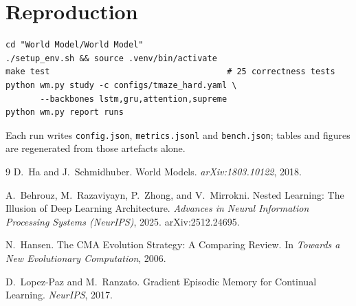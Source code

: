 \documentclass[11pt,a4paper]{article}
\newcommand{\code}[1]{\texttt{\small #1}}
\begin{document}
\section{Reproduction}

\begin{lstlisting}
cd "World Model/World Model"
./setup_env.sh && source .venv/bin/activate
make test                                    # 25 correctness tests
python wm.py study -c configs/tmaze_hard.yaml \
       --backbones lstm,gru,attention,supreme
python wm.py report runs
\end{lstlisting}

Each run writes \code{config.json}, \code{metrics.jsonl} and \code{bench.json};
tables and figures are regenerated from those artefacts alone.

\begin{thebibliography}{9}
D.~Ha and J.~Schmidhuber.
\newblock World Models.
\newblock \emph{arXiv:1803.10122}, 2018.

A.~Behrouz, M.~Razaviyayn, P.~Zhong, and V.~Mirrokni.
\newblock Nested Learning: The Illusion of Deep Learning Architecture.
\newblock \emph{Advances in Neural Information Processing Systems (NeurIPS)},
2025. arXiv:2512.24695.

N.~Hansen.
\newblock The CMA Evolution Strategy: A Comparing Review.
\newblock In \emph{Towards a New Evolutionary Computation}, 2006.

D.~Lopez-Paz and M.~Ranzato.
\newblock Gradient Episodic Memory for Continual Learning.
\newblock \emph{NeurIPS}, 2017.
\end{thebibliography}
\end{document}
